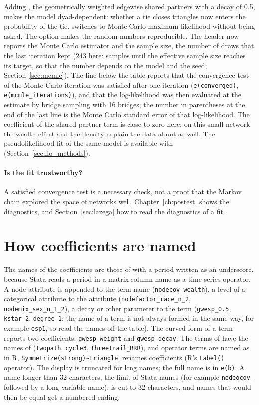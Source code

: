 Adding , the geometrically weighted edgewise shared partners with a decay of 0.5, makes the model dyad-dependent: whether a tie closes triangles now enters the probability of the tie. \nwergm{} switches to Monte Carlo maximum likelihood without being asked. The option  makes the random numbers reproducible.
The header now reports the Monte Carlo estimator and the sample size, the number of draws that the last iteration kept (243 here: \nwergm{} samples until the effective sample size reaches its target, so that the number depends on the model and the seed; Section~\ref{sec:mcmle}). The line below the table reports that the convergence test of the Monte Carlo iteration was satisfied after one iteration (\texttt{e(converged)}, \texttt{e(mcmle\_iterations)}), and that the log-likelihood was then evaluated at the estimate by bridge sampling with 16 bridges; the number in parentheses at the end of the last line is the Monte Carlo standard error of that log-likelihood. The coefficient of the shared-partner term is close to zero here: on this small network the wealth effect and the density explain the data about as well. The pseudolikelihood fit of the same model is available with  (Section~\ref{sec:flo_methods}).

\paragraph{Is the fit trustworthy?} A satisfied convergence test is a necessary check, not a proof that the Markov chain explored the space of networks well. Chapter~\ref{ch:postest} shows the diagnostics, and Section~\ref{sec:lazega} how to read the diagnostics of a fit.

\section{How coefficients are named}

The names of the coefficients are those of \ergm{} with a period written as an underscore, because Stata reads a period in a matrix column name as a time-series operator. A node attribute is appended to the term name (\texttt{nodecov\_wealth}), a level of a categorical attribute to the attribute (\texttt{nodefactor\_race\_n\_2}, \texttt{nodemix\_sex\_n\_1\_2}), a decay or other parameter to the term (\texttt{gwesp\_0.5}, \texttt{kstar\_2}, \texttt{degree\_1}; the name of a term is not always formed in the same way, for example \texttt{esp1}, so read the names off the table). The curved form of a term reports two coefficients, \texttt{gwesp\_weight} and \texttt{gwesp\_decay}. The terms of  have the names of \ergm{} (\texttt{twopath}, \texttt{cycle3}, \texttt{threetrail\_RRR}), and operator terms are named as in R, \texttt{Symmetrize(strong)\~{}triangle}.  renames coefficients (R's \texttt{Label()} operator). The display is truncated for long names; the full name is in \texttt{e(b)}. A name longer than 32 characters, the limit of Stata names (for example \texttt{nodeocov\_} followed by a long variable name), is cut to 32 characters, and names that would then be equal get a numbered ending.


